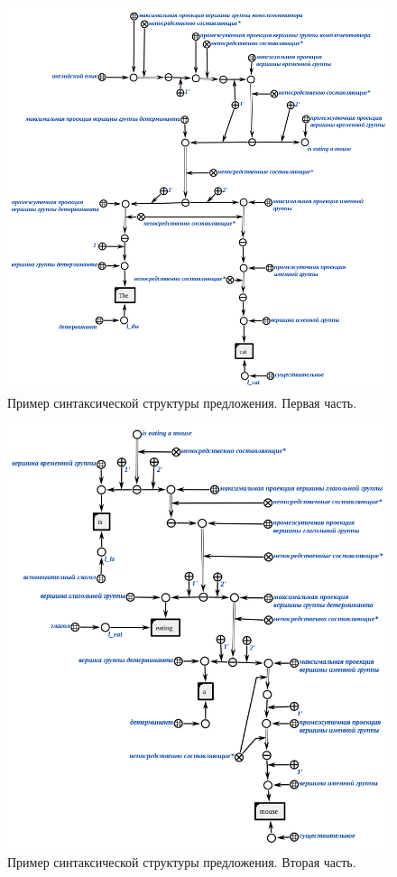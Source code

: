 \begin{figure}[h]
    \centering
    \includegraphics[scale=0.8]{images/part2/chapter_lang/syntactic_structure_part_1}
    \caption{Пример синтаксической структуры предложения. Первая часть.}
    \label{fig:pic_syntactic_tree_part_1}
\end{figure}

\begin{figure}[h]
    \centering
    \includegraphics[scale=0.8]{images/part2/chapter_lang/syntactic_structure_part_2}
    \caption{Пример синтаксической структуры предложения. Вторая часть.}
    \label{fig:pic_syntactic_tree_part_2}
\end{figure}

